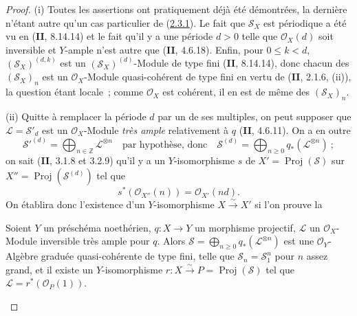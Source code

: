 \begin{proof}
(i) Toutes les assertions ont pratiquement déjà été démontrées, la
dernière n'étant autre qu'un cas particulier de
(\hyperref[III.2.3.1-fr]{2.3.1}). Le fait que $\mathcal S_X$ est
périodique a été vu en (\textbf{II}, 8.14.14) et le fait qu'il y a une période
$d>0$ telle que $\mathcal O_X(d)$ soit inversible et $Y$-ample n'est
autre que (\textbf{II}, 4.6.18). Enfin, pour $0\leq k<d$,
$(\mathcal S_X)^{(d,k)}$ est un $(\mathcal S_X)^{(d)}$-Module de type fini
(\textbf{II}, 8.14.14), donc chacun des $(\mathcal S_X)_n$ est un
$\mathcal O_X$-Module quasi-cohérent de type fini en vertu de
(\textbf{II}, 2.1.6, (ii)), la question étant locale~; comme $\mathcal O_X$ est
cohérent, il en est de même des $(\mathcal S_X)_n$.

(ii) Quitte à remplacer la période $d$ par un de ses multiples, on peut
supposer que $\mathcal L=\mathcal S'_d$ est un $\mathcal O_X$-Module
\emph{très ample} relativement à $q$ (\textbf{II}, 4.6.11). On a en outre
\[
\mathcal S'^{(d)}=\bigoplus_{n\in\mathbb Z}\mathcal L^{\otimes n}
\quad\text{par hypothèse, donc}\quad
\mathcal S^{(d)}=\bigoplus_{n\geq0}q_*(\mathcal L^{\otimes n})~;
\]
on sait (\textbf{II}, 3.1.8 et 3.2.9) qu'il y a un $Y$-isomorphisme $s$ de
$X'=\operatorname{Proj}(\mathcal S)$ sur
$X''=\operatorname{Proj}(\mathcal S^{(d)})$ tel que
\[
s^*(\mathcal O_{X''}(n))=\mathcal O_{X'}(nd).
\]
On établira donc l'existence d'un $Y$-isomorphisme $X\xrightarrow{\sim}X'$
si l'on prouve la

\begin{proposition}[2.3.4.1]
\label{III.2.3.4.1-fr}
Soient $Y$ un préschéma noethérien, $q:X\to Y$ un morphisme projectif,
$\mathcal L$ un $\mathcal O_X$-Module inversible très ample pour $q$.
Alors $\mathcal S=\bigoplus_{n\geq0}q_*(\mathcal L^{\otimes n})$ est une
$\mathcal O_Y$-Algèbre graduée quasi-cohérente de type fini, telle que
$\mathcal S_n=\mathcal S_1^n$ pour $n$ assez grand, et il existe un
$Y$-isomorphisme $r:X\xrightarrow{\sim}P=\operatorname{Proj}(\mathcal S)$
tel que $\mathcal L=r^*(\mathcal O_P(1))$.
\end{proposition}


\end{proof}
